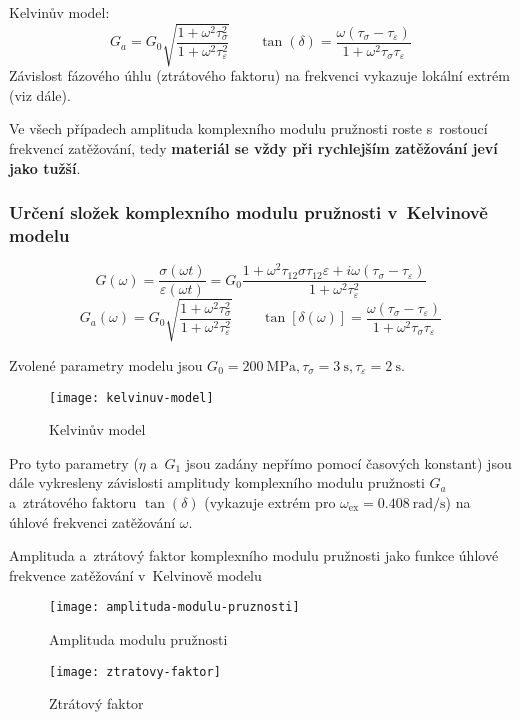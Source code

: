 Kelvinův model:
\begin{equation}
	G_a = G_0 \sqrt{\frac{1 + \omega^2 \tau_\sigma^2}{1 + \omega^2 \tau_\varepsilon^2}}
	\qquad
	\tan(\delta) = \frac{\omega (\tau_\sigma - \tau_\varepsilon)}{1 + \omega^2 \tau_\sigma \tau_\varepsilon}
\end{equation}
Závislost fázového úhlu (ztrátového faktoru) na frekvenci vykazuje lokální extrém (viz dále).

Ve všech případech amplituda komplexního modulu pružnosti roste s~rostoucí frekvencí zatěžování, tedy \textbf{materiál se vždy při rychlejším zatěžování jeví jako tužší}.

\subsubsection{Určení složek komplexního modulu pružnosti v~Kelvinově modelu}
\begin{equation}
	G(\omega)
	= \frac{\sigma(\omega t)}{\varepsilon(\omega t)}
	= G_0 \frac{1 + \omega^2 \tau_{12}\sigma \tau_{12}\varepsilon + i \omega (\tau_\sigma - \tau_\varepsilon)}{1 + \omega^2 \tau_\varepsilon^2}
\end{equation}
\begin{equation}
	G_a(\omega)
	= G_0 \sqrt{\frac{1 + \omega^2 \tau_\sigma^2}{1 + \omega^2 \tau_\varepsilon^2}}
	\qquad
	\tan\left[\delta(\omega)\right]
	= \frac{\omega (\tau_\sigma - \tau_\varepsilon)}{1 + \omega^2 \tau_\sigma \tau_\varepsilon}
\end{equation}

Zvolené parametry modelu jsou $G_0 = \SI{200}{\mega\pascal}, \tau_\sigma = \SI{3}{\second}, \tau_\varepsilon = \SI{2}{\second}$.
\begin{figure}[H]
	\centering
	\texttt{[image: kelvinuv-model]}
	\caption{Kelvinův model}
	\label{fig:kelvinuv-model}
\end{figure}
Pro tyto parametry ($\eta$ a~$G_1$ jsou zadány nepřímo pomocí časových konstant) jsou dále vykresleny závislosti amplitudy komplexního modulu pružnosti $G_a$ a~ztrátového faktoru $\tan(\delta)$ (vykazuje extrém pro $\omega_\text{ex} = \SI{0.408}{\radian\per\second}$) na úhlové frekvenci zatěžování $\omega$.

Amplituda a~ztrátový faktor komplexního modulu pružnosti jako funkce úhlové frekvence zatěžování v~Kelvinově modelu
\begin{figure}[H]
	\centering
	\begin{minipage}{0.5\linewidth}
		\centering
		\texttt{[image: amplituda-modulu-pruznosti]}
		\caption{Amplituda modulu pružnosti}
		\label{fig:amplituda-modulu-pruznosti}
	\end{minipage}%
	\begin{minipage}{0.5\linewidth}
		\centering
		\texttt{[image: ztratovy-faktor]}
		\caption{Ztrátový faktor}
		\label{fig:ztratovy-faktor}
	\end{minipage}
\end{figure}
